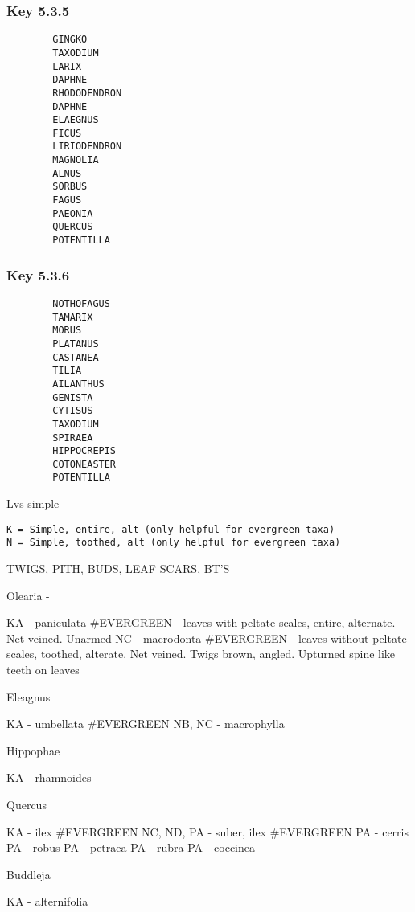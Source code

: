 \documentclass[openany]{book}
\begin{document}
\hypertarget{key-5.3.5}{%
\subsubsection{Key 5.3.5}\label{key-5.3.5}}

\begin{verbatim}
        GINGKO
        TAXODIUM
        LARIX
        DAPHNE
        RHODODENDRON
        DAPHNE
        ELAEGNUS
        FICUS
        LIRIODENDRON
        MAGNOLIA
        ALNUS
        SORBUS
        FAGUS
        PAEONIA
        QUERCUS
        POTENTILLA
\end{verbatim}

\hypertarget{key-5.3.6}{%
\subsubsection{Key 5.3.6}\label{key-5.3.6}}

\begin{verbatim}
        NOTHOFAGUS
        TAMARIX
        MORUS
        PLATANUS
        CASTANEA
        TILIA
        AILANTHUS
        GENISTA
        CYTISUS
        TAXODIUM
        SPIRAEA
        HIPPOCREPIS
        COTONEASTER
        POTENTILLA
\end{verbatim}

Lvs simple

\begin{verbatim}
K = Simple, entire, alt (only helpful for evergreen taxa)
N = Simple, toothed, alt (only helpful for evergreen taxa)
\end{verbatim}

TWIGS, PITH, BUDS, LEAF SCARS, BT'S

Olearia -

KA - paniculata \#EVERGREEN - leaves with peltate scales, entire,
alternate. Net veined. Unarmed NC - macrodonta \#EVERGREEN - leaves
without peltate scales, toothed, alterate. Net veined. Twigs brown,
angled. Upturned spine like teeth on leaves

Eleagnus

KA - umbellata \#EVERGREEN NB, NC - macrophylla

Hippophae

KA - rhamnoides

Quercus

KA - ilex \#EVERGREEN NC, ND, PA - suber, ilex \#EVERGREEN PA - cerris
PA - robus PA - petraea PA - rubra PA - coccinea

Buddleja

KA - alternifolia
\end{document}
